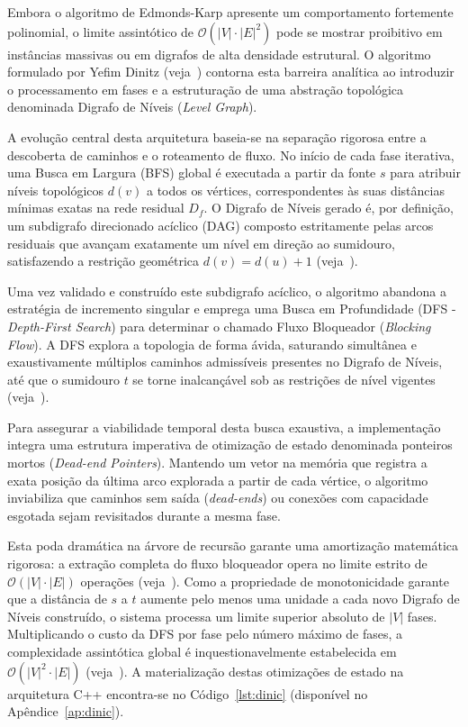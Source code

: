 \documentclass[12pt,a4paper]{article}
\begin{document}
Embora o algoritmo de Edmonds-Karp apresente um comportamento fortemente polinomial, o limite assintótico de $\mathcal{O}(|V| \cdot |E|^2)$ pode se mostrar proibitivo em instâncias massivas ou em digrafos de alta densidade estrutural. O algoritmo formulado por Yefim Dinitz (veja~\cite{dinic1970algorithm}) contorna esta barreira analítica ao introduzir o processamento em fases e a estruturação de uma abstração topológica denominada Digrafo de Níveis (\textit{Level Graph}).

A evolução central desta arquitetura baseia-se na separação rigorosa entre a descoberta de caminhos e o roteamento de fluxo. No início de cada fase iterativa, uma Busca em Largura (BFS) global é executada a partir da fonte $s$ para atribuir níveis topológicos $d(v)$ a todos os vértices, correspondentes às suas distâncias mínimas exatas na rede residual $D_f$. O Digrafo de Níveis gerado é, por definição, um subdigrafo direcionado acíclico (DAG) composto estritamente pelas arcos residuais que avançam exatamente um nível em direção ao sumidouro, satisfazendo a restrição geométrica $d(v) = d(u) + 1$ (veja~\cite{ahuja1993network}).

Uma vez validado e construído este subdigrafo acíclico, o algoritmo abandona a estratégia de incremento singular e emprega uma Busca em Profundidade (DFS - \textit{Depth-First Search}) para determinar o chamado Fluxo Bloqueador (\textit{Blocking Flow}). A DFS explora a topologia de forma ávida, saturando simultânea e exaustivamente múltiplos caminhos admissíveis presentes no Digrafo de Níveis, até que o sumidouro $t$ se torne inalcançável sob as restrições de nível vigentes (veja~\cite{cook1998combinatorial}).

Para assegurar a viabilidade temporal desta busca exaustiva, a implementação integra uma estrutura imperativa de otimização de estado denominada ponteiros mortos (\textit{Dead-end Pointers}). Mantendo um vetor na memória que registra a exata posição da última arco explorada a partir de cada vértice, o algoritmo inviabiliza que caminhos sem saída (\textit{dead-ends}) ou conexões com capacidade esgotada sejam revisitados durante a mesma fase.

Esta poda dramática na árvore de recursão garante uma amortização matemática rigorosa: a extração completa do fluxo bloqueador opera no limite estrito de $\mathcal{O}(|V| \cdot |E|)$ operações (veja~\cite{korte2018combinatorial}). Como a propriedade de monotonicidade garante que a distância de $s$ a $t$ aumente pelo menos uma unidade a cada novo Digrafo de Níveis construído, o sistema processa um limite superior absoluto de $|V|$ fases. Multiplicando o custo da DFS por fase pelo número máximo de fases, a complexidade assintótica global é inquestionavelmente estabelecida em $\mathcal{O}(|V|^2 \cdot |E|)$ (veja~\cite{dinic1970algorithm}). A materialização destas otimizações de estado na arquitetura C++ encontra-se no Código~\ref{lst:dinic} (disponível no Apêndice~\ref{ap:dinic}).
\end{document}
